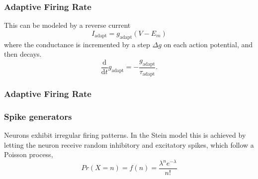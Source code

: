 \documentclass{beamer}
\begin{document}
\begin{frame}
	\frametitle{Adaptive Firing Rate}
	This can be modeled by a reverse current
	$$
 I_{\mathrm{adapt}} =  g_{\mathrm{adapt}}(V - E_m)
$$
where the conductance is incremented by a step $\Delta g$ on each action potential, and then decays.
$$
\frac{\mathrm{d}}{\mathrm{d}t} g_{\mathrm{adapt}}=-\frac{g_{\mathrm{adapt}}}{\tau_{\mathrm{adapt}}}.
$$
\end{frame}

\begin{frame}
	\frametitle{Adaptive Firing Rate}


\end{frame}


\begin{frame}
	\frametitle{Spike generators}
	Neurons exhibit irregular firing patterns. In the Stein model this is achieved by letting the neuron receive random inhibitory and excitatory spikes, which follow a Poisson process, 
	  $$
	   Pr(X=n) = f(n) =  \frac{\lambda^n e^{-\lambda }}{n!}
	  $$
\end{frame}
\end{document}
